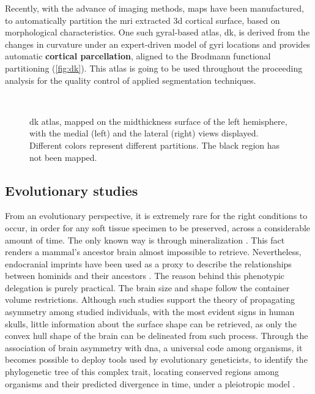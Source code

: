  Recently, with the advance of imaging methods, maps have been manufactured, to automatically partition the \ac{mri} extracted \ac{3d} cortical surface, based on morphological characteristics. One such gyral-based atlas, \ac{dk}, is derived from the changes in curvature under an expert-driven model of gyri locations \cite{Desikan2006} and provides automatic \textbf{cortical parcellation}, aligned to the Brodmann functional partitioning (\autoref{fig:dk}). This atlas is going to be used throughout the proceeding analysis for the quality control of applied segmentation techniques.
 
 \begin{figure}[H]
 	\centering
 	\\
 	\caption[Desikan-Killiany atlas on midthickness surface]{\Acl{dk} atlas, mapped on the midthickness surface of the left hemisphere, with the medial (left) and the lateral (right) views displayed.\cite{Dickie2019} Different colors represent different partitions. The black region has not been mapped.}
 	\label{fig:dk}
 \end{figure}
 
 \subsection{Evolutionary studies}
 From an evolutionary perspective, it is extremely rare for the right conditions to occur, in order for any soft tissue specimen to be preserved, across a considerable amount of time. The only known way is through mineralization \cite{Purnell2018}. This fact renders a mammal's ancestor brain almost impossible to retrieve. Nevertheless, endocranial imprints have been used as a proxy to describe the relationships between hominids and their ancestors \cite{Balzeau2012,Neubauer2020}. The reason behind this phenotypic delegation is purely practical. The brain size and shape follow the container volume restrictions. Although such studies support the theory of propagating asymmetry among studied individuals, with the most evident signs in human skulls, little information about the surface shape can be retrieved, as only the convex hull shape of the brain can be delineated from such process. Through the association of brain asymmetry with \acs{dna}, a universal code among organisms, it becomes possible to deploy tools used by evolutionary geneticists, to identify the phylogenetic tree of this complex trait, locating conserved regions among organisms and their predicted divergence in time, under a pleiotropic model \cite{Koch2021}.
 
